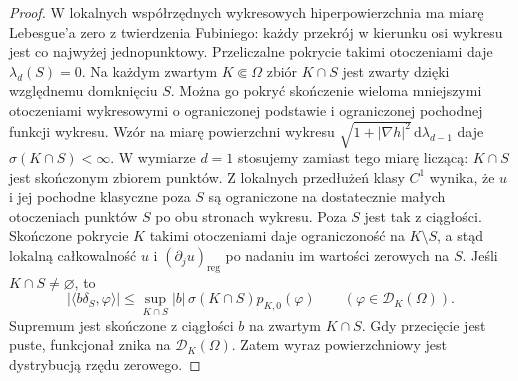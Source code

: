 \begin{proof}
W lokalnych współrzędnych wykresowych hiperpowierzchnia
ma miarę Lebesgue'a zero z twierdzenia Fubiniego:
każdy przekrój w kierunku osi wykresu jest co najwyżej
jednopunktowy. Przeliczalne pokrycie takimi otoczeniami
daje $\lambda_d(S)=0$. Na każdym zwartym $K\Subset\Omega$
zbiór $K\cap S$ jest zwarty dzięki względnemu domknięciu
$S$. Można go pokryć skończenie wieloma mniejszymi
otoczeniami wykresowymi o ograniczonej podstawie
i ograniczonej pochodnej funkcji wykresu.
Wzór na miarę powierzchni wykresu
$\sqrt{1+|\nabla h|^2}\,\mathrm d\lambda_{d-1}$
daje $\sigma(K\cap S)<\infty$.
W wymiarze $d=1$ stosujemy zamiast tego miarę
liczącą: $K\cap S$ jest skończonym zbiorem punktów.
Z lokalnych przedłużeń klasy $C^1$ wynika,
że $u$ i jej pochodne klasyczne poza $S$ są
ograniczone na dostatecznie małych otoczeniach
punktów $S$ po obu stronach wykresu. Poza $S$
jest tak z ciągłości. Skończone pokrycie $K$
takimi otoczeniami daje ograniczoność na $K\setminus S$,
a stąd lokalną całkowalność $u$
i $(\partial_ju)_{\mathrm{reg}}$ po nadaniu im
wartości zerowych na $S$.
Jeśli $K\cap S\ne\varnothing$, to
\[
 |\langle b\delta_S,\varphi\rangle|
 \le \sup_{K\cap S}|b|\,\sigma(K\cap S)p_{K,0}(\varphi)
 \qquad(\varphi\in\mathcal D_K(\Omega)).
\]
Supremum jest skończone z ciągłości $b$ na
zwartym $K\cap S$. Gdy przecięcie jest puste,
funkcjonał znika na $\mathcal D_K(\Omega)$. Zatem wyraz powierzchniowy
jest dystrybucją rzędu zerowego.


\end{proof}
